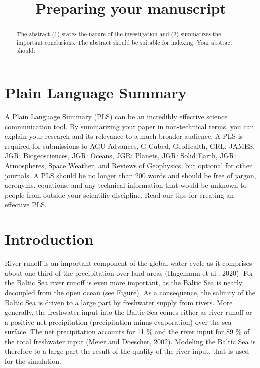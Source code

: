 \documentclass[
]{agujournal2019}
\begin{document}
\title{Preparing your manuscript}



\begin{abstract}
The abstract (1) states the nature of the investigation and (2)
summarizes the important conclusions. The abstract should be suitable
for indexing. Your abstract should:
\end{abstract}

\section*{Plain Language Summary}
A Plain Language Summary (PLS) can be an incredibly effective science
communication tool. By summarizing your paper in non-technical terms,
you can explain your research and its relevance to a much broader
audience. A PLS is required for submissions to AGU Advances, G-Cubed,
GeoHealth, GRL, JAMES, JGR: Biogeosciences, JGR: Oceans, JGR: Planets,
JGR: Solid Earth, JGR: Atmospheres, Space Weather, and Reviews of
Geophysics, but optional for other journals. A PLS should be no longer
than 200 words and should be free of jargon, acronyms, equations, and
any technical information that would be unknown to people from outside
your scientific discipline. Read our tips for creating an effective PLS.


\ifdefined\Shaded\renewenvironment{Shaded}{\begin{tcolorbox}[borderline west={3pt}{0pt}{shadecolor}, frame hidden, breakable, interior hidden, boxrule=0pt, sharp corners, enhanced]}{\end{tcolorbox}}\fi

\hypertarget{introduction}{%
\section{Introduction}\label{introduction}}

River runoff is an important component of the global water cycle as it
comprises about one third of the precipitation over land areas (Hagemann
et al., 2020). For the Baltic Sea river runoff is even more important,
as the Baltic Sea is nearly decoupled from the open ocean (see Figure).
As a consequence, the salinity of the Baltic Sea is driven to a large
part by freshwater supply from rivers. More generally, the freshwater
input into the Baltic Sea comes either as river runoff or a positive net
precipitation (precipitation minus evaporation) over the sea surface.
The net precipitation accounts for 11 \% and the river input for 89 \%
of the total freshwater input (Meier and Doescher, 2002). Modeling the
Baltic Sea is therefore to a large part the result of the quality of the
river input, that is used for the simulation.
\end{document}
